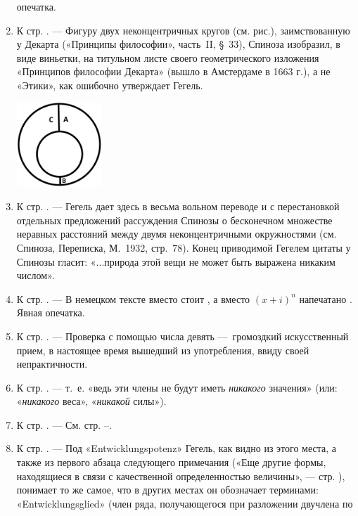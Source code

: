 \begin{enumerate}
опечатка.
\item \label{bkm:Ref474665962} К стр. \pageref{bkm:bm47}. — Фигуру двух
неконцентричных кругов (см. рис.), заимствованную у Декарта («Принципы
философии», часть~II, §~33), Спиноза изобразил, в виде виньетки, на
титульном листе своего геометрического изложения «Принципов философии
Декарта» (вышло в Амстердаме в 1663 г.), а не «Этики», как ошибочно
утверждает Гегель.
\begin{center}
\includegraphics[width=1.25in,height=1.25in]{hegel-img002.png}
\end{center}
\item \label{bkm:Ref474665968}К стр. \pageref{bkm:bm48}. — Гегель дает здесь
в весьма вольном переводе и с перестановкой отдельных предложений
рассуждения Спинозы о бесконечном множестве неравных расстояний между двумя
неконцентричными окружностями (см. Спиноза, Переписка, М.~1932, стр.~78).
Конец приводимой Гегелем цитаты у Спинозы гласит: «...природа этой вещи не
может быть выражена никаким числом».
\item \label{bkm:Ref474666121}К стр. \pageref{bkm:bm49}. — В немецком тексте
вместо  стоит , а вместо  $(x+i)^n$ напечатано . Явная опечатка.
\item \label{bkm:Ref474666136}К стр. \pageref{bkm:bm50}. — Проверка с
помощью числа девять —~громоздкий искусственный прием, в настоящее время
вышедший из употребления, ввиду своей непрактичности.
\item \label{bkm:Ref474666147}К стр. \pageref{bkm:bm51}. — т.~е. «ведь эти
члены не будут иметь {\em никакого} значения» (или: «{\em никакого}
веса», «{\em никакой} силы»).
\item \label{bkm:Ref474666169}К стр. \pageref{bkm:bm52}. — См. стр.
\pageref{bkm:bm52a}–\pageref{bkm:bm52b}.
\item \label{bkm:Ref474666189}К стр. \pageref{bkm:bm53}. — Под
«Entwicklungspotenz» Гегель, как видно из этого места, а также из первого
абзаца следующего примечания («Еще другие формы, находящиеся в связи с
качественной определенностью величины», — стр. \pageref{bkm:bm53a}),
понимает то же самое, что в других местах он обозначает терминами:
«Entwicklungsglied» (член ряда, получающегося при разложении двучлена  по

\end{enumerate}
